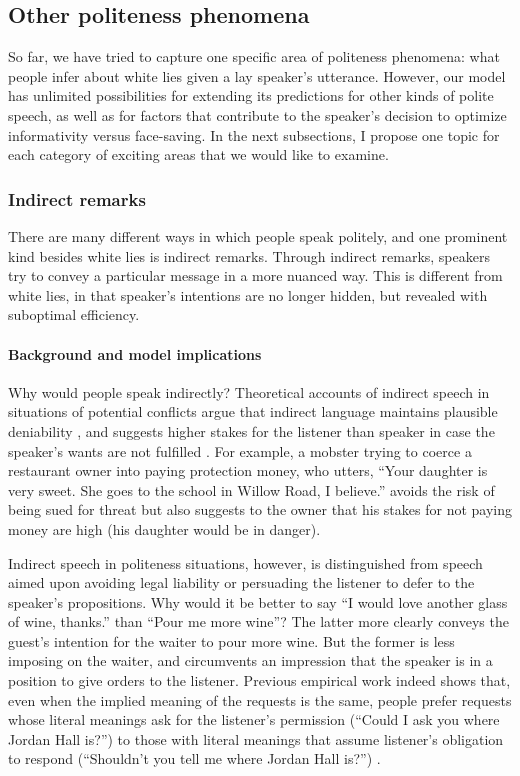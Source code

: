 \subsection{Other politeness phenomena}
\label{sec:other}

So far, we have tried to capture one specific area of politeness phenomena: what people infer about white lies given a lay speaker's utterance. However, our model has unlimited possibilities for extending its predictions for other kinds of polite speech, as well as for factors that contribute to the speaker's decision to optimize informativity versus face-saving. In the next subsections, I propose one topic for each category of exciting areas that we would like to examine. 

\subsubsection{Indirect remarks}

There are many different ways in which people speak politely, and one prominent kind besides white lies is indirect remarks. Through indirect remarks, speakers try to convey a particular message in a more nuanced way. This is different from white lies, in that speaker's intentions are no longer hidden, but revealed with suboptimal efficiency. 

\paragraph{Background and model implications} Why would people speak indirectly? Theoretical accounts of indirect speech in situations of potential conflicts argue that indirect language maintains plausible deniability \citep{pinker2008}, and suggests higher stakes for the listener than speaker in case the speaker's wants are not fulfilled \citep{franke2016}. For example, a mobster trying to coerce a restaurant owner into paying protection money, who utters, ``Your daughter is very sweet. She goes to the school in Willow Road, I believe.'' avoids the risk of being sued for threat but also suggests to the owner that his stakes for not paying money are high (his daughter would be in danger). 

Indirect speech in politeness situations, however, is distinguished from speech aimed upon avoiding legal liability or persuading the listener to defer to the speaker's propositions. Why would it be better to say ``I would love another glass of wine, thanks.'' than ``Pour me more wine''? The latter more clearly conveys the guest's intention for the waiter to pour more wine. But the former is less imposing on the waiter, and circumvents an impression that the speaker is in a position to give orders to the listener. Previous empirical work indeed shows that, even when the implied meaning of the requests is the same, people prefer requests whose literal meanings ask for the listener's permission (``Could I ask you where Jordan Hall is?'') to those with literal meanings that assume listener's obligation to respond (``Shouldn't you tell me where Jordan Hall is?'') \citep{clark1980}. 

